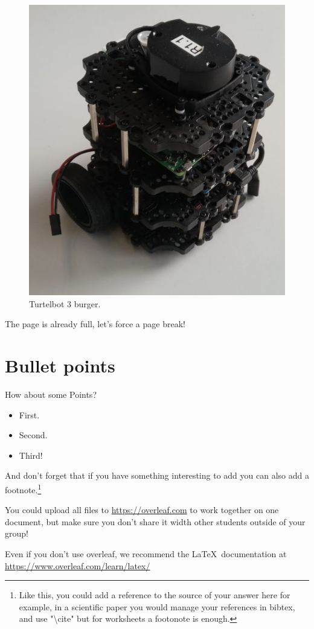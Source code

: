 \documentclass{rdl}
\begin{document}
\begin{figure}[h!]  %
  \includegraphics[width=0.25\linewidth]{picture/turtlebot.jpg}
  \caption{Turtelbot 3 burger.}
  \label{fig:turtlebot}
\end{figure}

The page is already full, let's force a page break!
\newpage 

\section{Bullet points}
\label{sec:quiz}

How about some Points?

\begin{itemize}
  \item First.
  \item Second.
  \item Third!
\end{itemize}

And don't forget that if you have something interesting to add you can also add a footnote.\footnote{Like this, you could add a reference to the source of your answer here for example, in a scientific paper you would manage your references in bibtex, and use "\textbackslash cite" but for worksheets a footonote is enough.}

You could upload all files to \url{https://overleaf.com} to work together on one document, but make sure you don't share it width other students outside of your group!

Even if you don't use overleaf, we recommend the \LaTeX\ documentation at \url{https://www.overleaf.com/learn/latex/}
\end{document}
